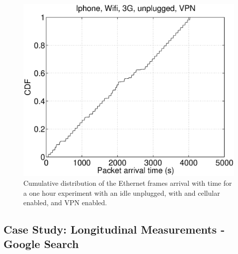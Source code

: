 \begin{figure}
\centering
        \includegraphics[width=0.8\linewidth]{../../code/pushNotification/Fig/bw_iphone_wifi_3g_unplug_vpn_ts.eps}
  \caption{Cumulative distribution of the Ethernet frames
          arrival with time for a one hour experiment with an idle
          \iphone{} unplugged, with \wifi{} and cellular enabled, and VPN
          enabled.}
  \label{fig:push_w3v_ts}
\end{figure}


\subsection{Case Study: Longitudinal Measurements - Google Search }
\label{sec:case-study-google}




